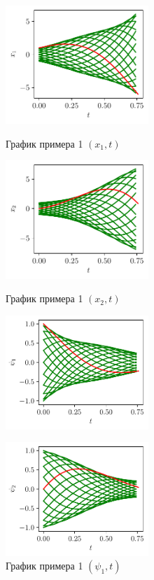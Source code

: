 \documentclass[12pt, a4paper]{article} %
\begin{document}
\begin{figure}[H]
    \begin{multicols}{2}
        \begin{centering}
            \includegraphics[width=0.48\textwidth]{figures/ex1_x1t.pdf}
            \label{fig:ex1_x1t}
            \caption{График примера 1 $(x_1, t)$}
            \hfill 
            \includegraphics[width=0.48\textwidth]{figures/ex1_x2t.pdf}
            \label{fig:ex1_x2t}
            \caption{График примера 1 $(x_2, t)$}
        \end{centering} 
    \end{multicols}
    \vfill
    \begin{multicols}{2}
        \begin{centering}
            \includegraphics[width=0.48\textwidth]{figures/ex1_p1t.pdf}
            \label{fig:ex1_p1t}
            \caption{График примера 1 $(\psi_1, t)$}
            \hfill 
            \includegraphics[width=0.48\textwidth]{figures/ex1_p2t.pdf}

\end{centering}
\end{multicols}
\end{figure}
\end{document}
